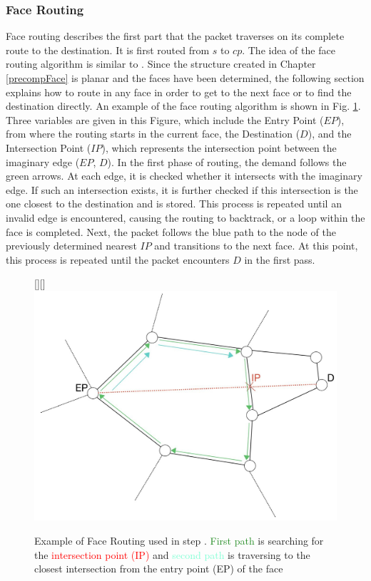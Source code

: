 \documentclass[a4paper,UKenglish,cleveref, autoref, thm-restate,dvipsnames]{lipics-v2021}
\begin{document}
\subsubsection{Face Routing}
\label{routingFaces}
Face routing describes the first part that the packet traverses on its complete route to the destination. It is first routed from $s$ to $cp$. 
The idea of the face routing algorithm is similar to \cite{facerouting}.
Since the structure created in Chapter \ref{precompFace} is planar and the faces have been determined, the following section explains how to route in any face in order to get to the next face or to find the destination directly.
An example of the face routing  algorithm is shown in Fig. \ref{faceRoutingExample}. 
Three variables are given in this Figure, which include the Entry Point ($EP$), from where the routing starts in the current face, the Destination ($D$), and the Intersection Point ($IP$), which represents the intersection point between the imaginary edge ($EP$, $D$).
In the first phase of routing, the demand follows the green arrows. At each edge, it is checked whether it intersects with the imaginary edge. If such an intersection exists, it is further checked if this intersection is the one closest to the destination and is stored. This process is repeated until an invalid edge is encountered, causing the routing to backtrack, or a loop within the face is completed.
Next, the packet follows the blue path to the node of the previously determined nearest $IP$ and transitions to the next face. At this point, this process is repeated until the packet encounters $D$ in the first pass.


\begin{figure}[h]
    \centering
    \raisebox{0pt}[\height][\depth]{\hspace*{-1cm}\includegraphics[scale=0.2]{figures/faceroutingExample.jpg}}
    \caption{Example of Face Routing used in step . \textcolor{ForestGreen}{First path} is searching for the \textcolor{red}{intersection point (IP)} and \textcolor{Aquamarine}{second path} is traversing to the closest intersection from the entry point (EP) of the face}

    \label{faceRoutingExample}
\end{figure}
\newpage
\end{document}
